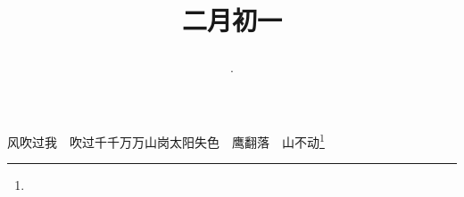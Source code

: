 \title{\date[d=10,m=3,y=2024][year:cn-y,年,month:cn,day:cn,日,·,weekday]·二月初一 }
风吹过我　吹过千千万万山岗太阳失色　鹰翻落　山不动\footnote{ }

